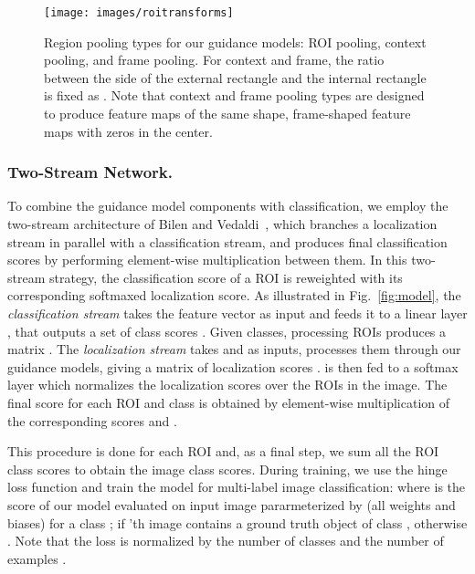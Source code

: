 \documentclass[runningheads]{llncs}
\begin{document}
\begin{figure}[t] \texttt{[image: images/roitransforms]} \caption[small]{Region pooling types for our guidance models: ROI pooling, context pooling, and frame pooling. For context and frame, the ratio between the side of the external rectangle and the internal rectangle is fixed as 
. Note that context and frame pooling types are designed to produce feature maps of the same shape, \ie frame-shaped feature maps with zeros in the center.} \label{fig:roitransforms} \end{figure}



\subsubsection{Two-Stream Network.} To combine the guidance model components
with classification, we employ the two-stream architecture of Bilen and
Vedaldi~\cite{Bilen:2015uo}, which branches a localization stream in parallel
with a classification stream, and produces final classification scores by
performing element-wise multiplication between them. In this two-stream strategy, the
classification score of a ROI is reweighted with its corresponding softmaxed
localization score. As illustrated in Fig.~\ref{fig:model}, the {\em classification stream} takes the feature vector  
 as input and feeds it to a linear layer , that outputs a set of class
scores . Given  classes, processing  ROIs produces a matrix . The {\em localization stream} takes  and  as inputs, processes them through our guidance models, giving a matrix of localization
scores .  is then fed to a softmax layer  which normalizes the localization scores over the ROIs in the image. 
The final score for each ROI and class is obtained by element-wise multiplication of the corresponding scores  and . 



This procedure is done for each ROI and, as a final step, we sum all the ROI
class scores to obtain the image class scores. During training, we use the hinge
loss function and train the model for multi-label image classification:  where  is the score of our model evaluated on input image 
pararmeterized by  (all weights and biases) for a class ;  if
'th image contains a ground truth object of class , otherwise . Note that the loss is normalized by the number of classes  and the
number of examples . 
\end{document}
